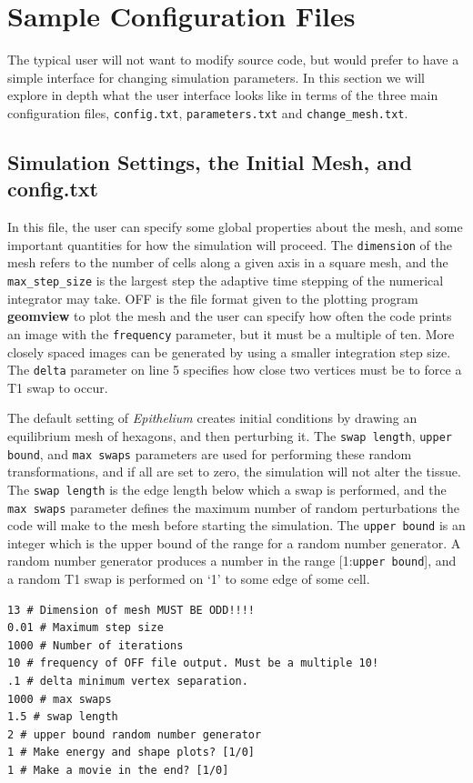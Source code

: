 \section{Sample Configuration Files}
The typical user will not want to modify source code, but would prefer to have a simple interface for changing simulation parameters. In this section we will explore in depth what the user interface looks like in terms of the three main configuration files, \texttt{config.txt}, \texttt{parameters.txt} and \texttt{change\_mesh.txt}.
\subsection{Simulation Settings, the Initial Mesh, and config.txt}
In this file, the user can specify some global properties about the mesh, and some important quantities for how the simulation will proceed. The \texttt{dimension} of the mesh refers to the number of cells along a given axis in a square mesh, and the \texttt{max\_step\_size} is the largest step the adaptive time stepping of the numerical integrator may take. OFF is the file format given to the plotting program \textbf{geomview} to plot the mesh and the user can specify how often the code prints an image with the \texttt{frequency} parameter, but it must be a multiple of ten. More closely spaced images can be generated by using a smaller integration step size. The \texttt{delta} parameter on line 5 specifies how close two vertices must be to force a T1 swap to occur.

The default setting of \emph{Epithelium} creates initial conditions by drawing an equilibrium mesh of hexagons, and then perturbing it.
The \texttt{swap length}, \texttt{upper bound}, and \texttt{max swaps} parameters are used for performing these random transformations, and if all are set to zero, the simulation will not alter the tissue. The \texttt{swap length} is the edge length below which a swap is performed, and the \texttt{max swaps} parameter defines the maximum number of random perturbations the code will make to the mesh before starting the simulation. The \texttt{upper bound} is an integer which is the upper bound of the range for a random number generator. A random number generator produces a number in the range [1:\texttt{upper bound}], and a random T1 swap is performed on `1' to some edge of some cell. 

\begin{lstlisting}
13 # Dimension of mesh MUST BE ODD!!!!
0.01 # Maximum step size
1000 # Number of iterations
10 # frequency of OFF file output. Must be a multiple 10!
.1 # delta minimum vertex separation.
1000 # max swaps
1.5 # swap length
2 # upper bound random number generator
1 # Make energy and shape plots? [1/0]
1 # Make a movie in the end? [1/0]
\end{lstlisting}

